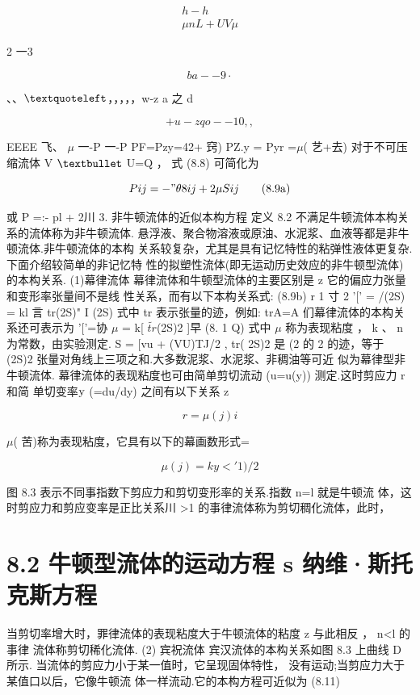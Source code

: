 \begin{gather*}
h-h\\
\mu  nL + U V \mu 
\end{gather*}

2 一3

\[ba --9\cdot \]

、、${\rm ‘}$，，，，，w-z a 之 d

\[+ u-z qo--10 , , \]

EEEE 飞、 $\mu$ 一-P 一-P PF=Pzy=42+ 窍) PZ.y = Pyr =$\mu$( 艺+去) 对于不可压缩流体 V ${\rm •}$ U=Q ， 式 (8.8) 可简化为

\begin{equation*}Pij =- "\theta 8ij +2\mu Sij\tag{8.9a}\end{equation*}

或 P =:- pl + 2川 3. 非牛顿流体的近似本构方程 定义 8.2 不满足牛顿流体本构关系的流体称为非牛顿流体. 悬浮液、聚合物溶液或原油、水泥浆、血液等都是非牛顿流体.非牛顿流体的本构 关系较复杂，尤其是具有记忆特性的粘弹性液体更复杂.下面介绍较简单的非记忆特 性的拟塑性流体(即无运动历史效应的非牛顿型流体)的本构关系. (1)幕律流体 幕律流体和牛顿型流体的主要区别是 z 它的偏应力张量和变形率张量间不是线 性关系，而有以下本构关系式: (8.9b) r 1 寸 2 '[' = /(2S) = kl 言 tr(2S)" I (2S) 式中 tr 表示张量的迹，例如: trA=A 们幕律流体的本构关系还可表示为 '['=协 $\mu$ = k[ $\tilde{tr}$(2S)2 ]早 (8. 1 Q) 式中 $\mu$ 称为表现粘度 ， k 、 n 为常数，由实验测定. S = [vu + (VU)TJ/2 , tr( 2S)2 是 (2 的 2 的迹，等于 (2S)2 张量对角线上三项之和.大多数泥浆、水泥浆、非稠油等可近 似为幕律型非牛顿流体. 幕律流体的表现粘度也可由简单剪切流动 (u=u(y)) 测定.这时剪应力 r 和简 单切变率${\rm y}$ (=du/dy) 之间有以下关系 z

\[r=\mu  (j) i\]

$\mu$( 苦)称为表现粘度，它具有以下的幕画数形式=

\[\mu  (j) = k y<' 1) /2\]

图 8.3 表示不同事指数下剪应力和剪切变形率的关系.指数 n=l 就是牛顿流 体，这时剪应力和剪应变率是正比关系川 >1 的事律流体称为剪切稠化流体，此时，

\section*{8.2  牛顿型流体的运动方程 s 纳维·斯托克斯方程}

当剪切率增大时，罪律流体的表现粘度大于牛顿流体的粘度 z 与此相反 ， n<l 的事律 流体称剪切稀化流体. (2) 宾祝流体 宾汉流体的本构关系如图 8.3 上曲线 D 所示. 当流体的剪应力小于某一值时，它呈现固体特性， 没有运动;当剪应力大于某值口以后，它像牛顿流 体一样流动.它的本构方程可近似为 (8.11)

